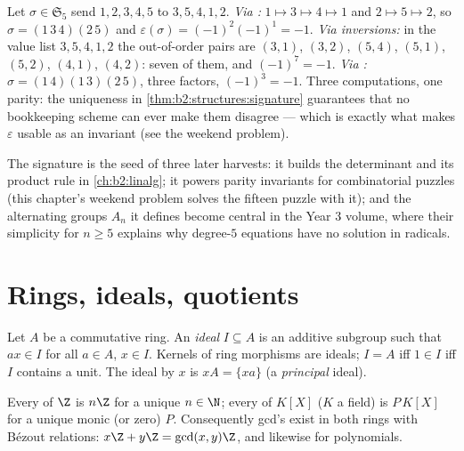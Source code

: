 \begin{example}\label{ex:b2:structures:threeroads}
Let $\sigma \in \mathfrak{S}_5$ send $1, 2, 3, 4, 5$ to $3, 5, 4,
1, 2$. \emph{Via :} $1 \mapsto 3 \mapsto 4 \mapsto 1$ and $2
\mapsto 5 \mapsto 2$, so $\sigma = (1\,3\,4)(2\,5)$ and
$\varepsilon(\sigma) = (-1)^{2}(-1)^{1} = -1$. \emph{Via
inversions:} in the value list $3, 5, 4, 1, 2$ the out-of-order
pairs are $(3,1)$, $(3,2)$, $(5,4)$, $(5,1)$, $(5,2)$, $(4,1)$,
$(4,2)$: seven of them, and $(-1)^7 = -1$. \emph{Via
:} $\sigma = (1\,4)(1\,3)(2\,5)$, three factors,
$(-1)^3 = -1$. Three computations, one parity: the uniqueness in
\cref{thm:b2:structures:signature} guarantees that no bookkeeping
scheme can ever make them disagree --- which is exactly what makes
$\varepsilon$ usable as an invariant (see the weekend problem).
\end{example}

\begin{remark}
The signature is the seed of three later harvests: it builds the
determinant and its product rule in \cref{ch:b2:linalg}; it powers
parity invariants for combinatorial puzzles (this chapter's weekend
problem solves the fifteen puzzle with it); and the alternating
groups $A_n$ it defines become central in the Year 3 volume, where
their simplicity for $n \geq 5$ explains why degree-$5$ equations
have no solution in radicals.
\end{remark}

\section{Rings, ideals, quotients}

\begin{definition}[Ideal]\label{def:b2:structures:ideal}
Let $A$ be a commutative ring. An \emph{ideal} $I
\subseteq A$ is an additive subgroup such that $a x \in I$ for all
$a \in A$, $x \in I$. Kernels of ring morphisms are ideals; $I = A$
iff $1 \in I$ iff $I$ contains a unit. The ideal \emph{} by
$x$ is $xA = \{xa\}$ (a \emph{principal} ideal).
\end{definition}

\begin{theorem}\label{thm:b2:structures:principal}
Every  of $\Z$ is $n\Z$ for a unique $n \in \N$; every  of
$K[X]$ ($K$ a field) is $P\,K[X]$ for a unique monic (or zero) $P$.
Consequently gcd's exist in both rings with Bézout relations: $x\Z +
y\Z = \gcd(x,y)\Z$, and likewise for polynomials.
\end{theorem}

